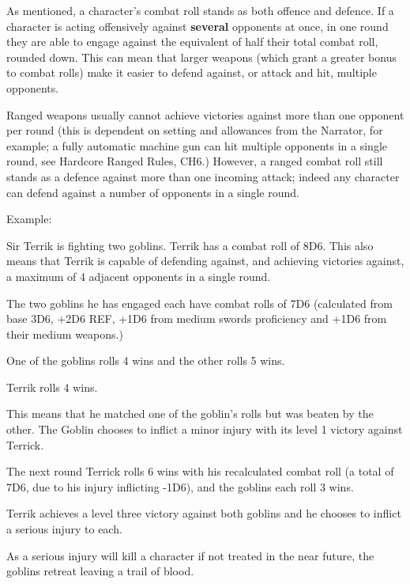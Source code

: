 As mentioned, a character’s combat roll stands as both offence and defence. If a character is acting offensively against \textbf{several} opponents at once, in one round they are able to engage against the equivalent of half their total combat roll, rounded down. This can mean that larger weapons (which grant a greater bonus to combat rolls) make it easier to defend against, or attack and hit, multiple opponents.

Ranged weapons usually cannot achieve victories against more than one opponent per round (this is dependent on setting and allowances from the Narrator, for example; a fully automatic machine gun can hit multiple opponents in a single round, see Hardcore Ranged Rules, CH6.) However, a ranged combat roll still stands as a defence against more than one incoming attack; indeed any character can defend against a number of opponents in a single round.

Example:

\begin{displayquote}
    Sir Terrik is fighting two goblins. Terrik has a combat roll of 8D6. This also means that Terrik is capable of defending against, and achieving victories against, a maximum of 4 adjacent opponents in a single round.

    The two goblins he has engaged each have combat rolls of 7D6 (calculated from base 3D6, +2D6 REF, +1D6 from medium swords proficiency and +1D6 from their medium weapons.)

    One of the goblins rolls 4 wins and the other rolls 5 wins.

    Terrik rolls 4 wins.

    This means that he matched one of the goblin's rolls but was beaten by the other. The Goblin chooses to inflict a minor injury with its level 1 victory against Terrick.

    The next round Terrick rolls 6 wins with his recalculated combat roll (a total of 7D6, due to his injury inflicting -1D6), and the goblins each roll 3 wins.

    Terrik achieves a level three victory against both goblins and he chooses to inflict a serious injury to each.

    As a serious injury will kill a character if not treated in the near future, the goblins retreat leaving a trail of blood.
\end{displayquote}